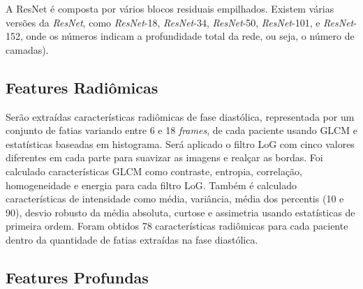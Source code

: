 A ResNet é composta por vários blocos residuais empilhados.
Existem várias versões da \textit{ResNet}, como \textit{ResNet}-18, \textit{ResNet}-34, \textit{ResNet}-50, \textit{ResNet}-101, e \textit{ResNet}-152, onde os números indicam a profundidade total da rede, ou seja, o número de camadas).

\subsection{Features Radiômicas}
\label{subsec:cap4_features_radiomicas}

Serão extraídas características radiômicas de fase diastólica, representada por um conjunto de fatias variando entre 6 e 18 \textit{frames}, de cada paciente usando \gls{GLCM} e estatísticas baseadas em histograma. Será aplicado o filtro \gls{LoG} com cinco valores diferentes em cada parte para suavizar as imagens e realçar as bordas. Foi calculado características \gls{GLCM} como contraste, entropia, correlação, homogeneidade e energia para cada filtro \gls{LoG}. Também é calculado características de intensidade como média, variância, média dos percentis (10 e 90), desvio robusto da média absoluta, curtose e assimetria usando estatísticas de primeira ordem. Foram obtidos 78 características radiômicas para cada paciente dentro da quantidade de fatias extraídas na fase diastólica.


\subsection{Features Profundas}
\label{subsec:cap4_features_profundas}
 
